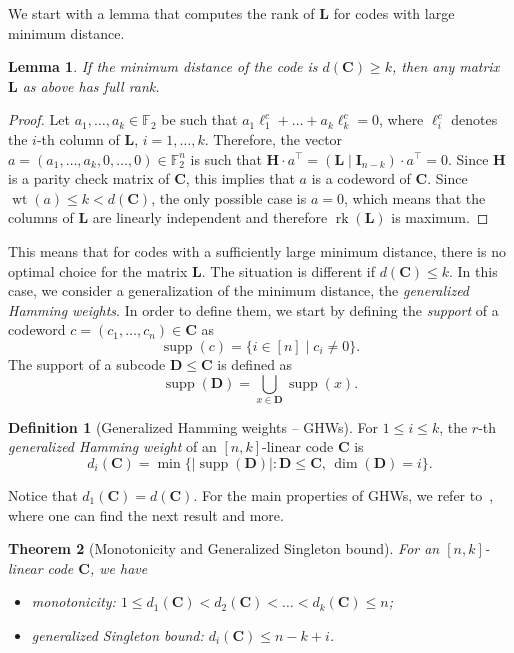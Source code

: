 \documentclass[11pt]{article}
\newcommand{\F}[0]{\mathbb{F}}
\theoremstyle{plain}
\newtheorem{theo}{Theorem}[section]
\newtheorem{lem}[theo]{Lemma}
\theoremstyle{definition}
\newtheorem{defin}{Definition}[section]
\theoremstyle{remark}
\begin{document}
We start with a lemma that computes the rank of $\mathbf{L}$ for codes with large minimum distance.
\begin{lem}
    If the minimum distance of the code is $d(\mathbf{C})\geq k$, then any matrix $\mathbf{L}$ as above has full rank.
\end{lem}
\begin{proof}
    Let $a_1,\dots,a_k\in\F_2$ be such that $a_1\ell^c_1+\dots +a_k\ell^c_k=0$, where $\ell^c_i$ denotes the $i$-th column of $\mathbf{L}$, $i=1,\dots,k$. Therefore, the vector $a=(a_1,\dots,a_k,0,\dots,0)\in\F_2^{n}$ is such that $\mathbf{H}\cdot a^\top=(\mathbf{L}\mid \mathbf{I}_{n-k})\cdot a^\top=0$. Since $\mathbf{H}$ is a parity check matrix of $\mathbf{C}$, this implies that $a$ is a codeword of $\mathbf{C}$. Since $\operatorname{wt}(a)\leq k<d(\mathbf{C})$, the only possible case is $a=0$, which means that the columns of $\mathbf{L}$ are linearly independent and therefore $\operatorname{rk}(\mathbf{L})$ is maximum.
    
\end{proof}

This means that for codes with a sufficiently large minimum distance, there is no optimal choice for the matrix $\mathbf{L}$. The situation is different if $d(\mathbf{C})\leq k$. In this case, we consider a generalization of the minimum distance, the \textit{generalized Hamming weights}. In order to define them, we start by defining the \textit{support} of a codeword $c=(c_1,\dots,c_n)\in\mathbf{C}$ as $$\operatorname{supp}(c)=\{i\in[n]\mid c_i\neq0\}.$$ The support of a subcode $\mathbf{D}\leq\mathbf{C}$ is defined as $$\operatorname{supp}(\mathbf{D})=\bigcup\limits_{x\in\mathbf{D}}\operatorname{supp}(x).$$
\begin{defin}[Generalized Hamming weights -- GHWs]
    For $1\leq i\leq k$, the $r$-th \emph{generalized Hamming weight} of an $[n,k]$-linear code $\mathbf{C}$ is
    \begin{equation*}
        d_i(\mathbf{C})=\min\{|\operatorname{supp}(\mathbf{D})| : \mathbf{D}\leq\mathbf{C},\,\operatorname{dim}(\mathbf{D})=i\}.
    \end{equation*}
\end{defin}
Notice that $d_1(\mathbf{C})=d(\mathbf{C})$. For the main properties of GHWs, we refer to~\cite[Chapter 7.10]{HuffmanPless2003Fundamentals}, where one can find the next result and more.
\begin{theo}[Monotonicity and Generalized Singleton bound]
    For an $[n,k]$-linear code $\mathbf{C}$, we have
    \begin{itemize}
        \item \textit{monotonicity}: $1\leq d_1(\mathbf{C})<d_2(\mathbf{C})<\dots<d_k(\mathbf{C})\leq n$;
        \item \textit{generalized Singleton bound}: $d_i(\mathbf{C})\leq n-k+i$.
    \end{itemize}
\end{theo}
\end{document}
